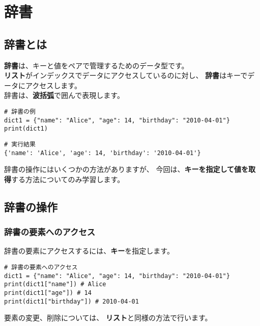 \documentclass[a4paper,titlepage,dvipdfmx]{jarticle}
\begin{document}
\section{辞書}
\subsection{辞書とは}
\textbf{辞書}は、キーと値をペアで管理するためのデータ型です。\\
\textbf{リスト}がインデックスでデータにアクセスしているのに対し、
\textbf{辞書}はキーでデータにアクセスします。\\
辞書は、\textbf{波括弧}で囲んで表現します。\\
\begin{lstlisting}[caption=辞書の例,label=辞書の例]
# 辞書の例
dict1 = {"name": "Alice", "age": 14, "birthday": "2010-04-01"}
print(dict1)
\end{lstlisting}
\begin{lstlisting}[caption=辞書の例の実行結果,label=辞書の例の実行結果]
# 実行結果
{'name': 'Alice', 'age': 14, 'birthday': '2010-04-01'}
\end{lstlisting}

辞書の操作にはいくつかの方法がありますが、
今回は、\textbf{キーを指定して値を取得}する方法についてのみ学習します。

\subsection{辞書の操作}
\subsubsection{辞書の要素へのアクセス}
辞書の要素にアクセスするには、\textbf{キー}を指定します。\\
\begin{lstlisting}[caption=辞書の要素へのアクセス,label=辞書の要素へのアクセス]
# 辞書の要素へのアクセス
dict1 = {"name": "Alice", "age": 14, "birthday": "2010-04-01"}
print(dict1["name"]) # Alice
print(dict1["age"]) # 14
print(dict1["birthday"]) # 2010-04-01
\end{lstlisting}

要素の変更、削除については、
\textbf{リスト}と同様の方法で行います。
\end{document}
